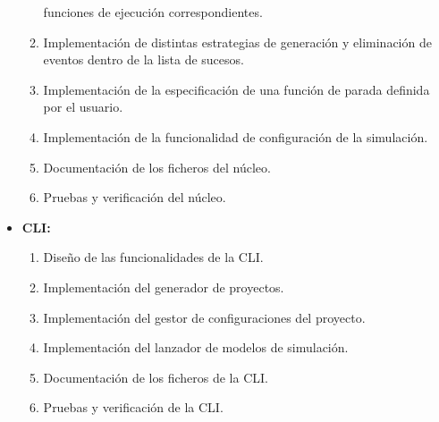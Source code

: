 \begin{itemize}
\begin{enumerate}
        funciones de ejecución correspondientes.
        \item Implementación de distintas estrategias de generación y
        eliminación de eventos dentro de la lista de sucesos.
        \item Implementación de la especificación de una función de parada
        definida por el usuario.
        \item Implementación de la funcionalidad de configuración de la simulación.
        \item Documentación de los ficheros del núcleo.
        \item Pruebas y verificación del núcleo.
    \end{enumerate}
    \item \textbf{CLI:}
    \begin{enumerate}
        \item Diseño de las funcionalidades de la CLI.
        \item Implementación del generador de proyectos.
        \item Implementación del gestor de configuraciones del proyecto.
        \item Implementación del lanzador de modelos de simulación.
        \item Documentación de los ficheros de la CLI.
        \item Pruebas y verificación de la CLI.
    \end{enumerate}
\end{itemize}

